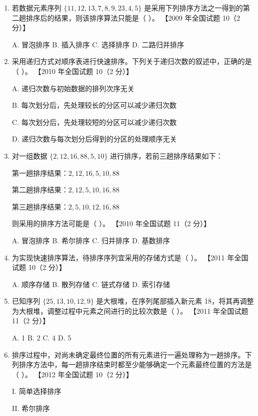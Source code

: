 \documentclass[lang=cn,newtx,10pt,scheme=chinese]{../../elegantbook}
\begin{document}
\begin{enumerate}
    \item 若数据元素序列 $\{11, 12, 13, 7, 8, 9, 23, 4, 5\}$ 是采用下列排序方法之一得到的第二趟排序后的结果，则该排序算法只能是（ ）。  
    【2009 年全国试题 10（2 分）】  

    A. 冒泡排序 \quad B. 插入排序 \quad C. 选择排序 \quad D. 二路归并排序  

    \item 采用递归方式对顺序表进行快速排序。下列关于递归次数的叙述中，正确的是（ ）。  
    【2010 年全国试题 10（2 分）】  

    A. 递归次数与初始数据的排列次序无关  

    B. 每次划分后，先处理较长的分区可以减少递归次数  

    C. 每次划分后，先处理较短的分区可以减少递归次数  
    
    D. 递归次数与每次划分后得到的分区的处理顺序无关  

    \item 对一组数据 $\{2, 12, 16, 88, 5, 10\}$ 进行排序，若前三趟排序结果如下：  
    
    第一趟排序结果：$2, 12, 16, 5, 10, 88$  
    
    第二趟排序结果：$2, 12, 5, 10, 16, 88$  
    
    第三趟排序结果：$2, 5, 10, 12, 16, 88$  
   
    则采用的排序方法可能是（ ）。  
    【2010 年全国试题 11（2 分）】  

    A. 冒泡排序 \quad B. 希尔排序 \quad C. 归并排序 \quad D. 基数排序  

    \item 为实现快速排序算法，待排序序列宜采用的存储方式是（ ）。  
    【2011 年全国试题 10（2 分）】  

    A. 顺序存储 \quad B. 散列存储 \quad C. 链式存储 \quad D. 索引存储  

    \item 已知序列 $\{25, 13, 10, 12, 9\}$ 是大根堆，在序列尾部插入新元素 18，将其再调整为大根堆，调整过程中元素之间进行的比较次数是（ ）。  
    【2011 年全国试题 11（2 分）】  

    A. 1 \quad B. 2 \quad C. 4 \quad D. 5  

    \item 排序过程中，对尚未确定最终位置的所有元素进行一遍处理称为一趟排序。下列排序方法中，每一趟排序结束时都至少能够确定一个元素最终位置的方法是（ ）。  
    【2012 年全国试题 10（2 分）】  

    I. 简单选择排序  

    II. 希尔排序  


\end{enumerate}
\end{document}

